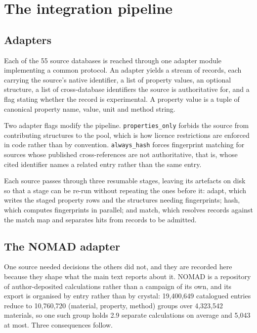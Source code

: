 \section{The integration pipeline}\label{note:pipeline}

\subsection{Adapters}

Each of the 55 source databases is reached through one adapter module
implementing a common protocol. An adapter yields a stream of records, each
carrying the source's native identifier, a list of property values, an optional
structure, a list of cross-database identifiers the source is authoritative for,
and a flag stating whether the record is experimental. A property value is a
tuple of canonical property name, value, unit and method string.

Two adapter flags modify the pipeline. \texttt{properties\_only} forbids the
source from contributing structures to the pool, which is how licence
restrictions are enforced in code rather than by convention.
\texttt{always\_hash} forces fingerprint matching for sources whose published
cross-references are not authoritative, that is, whose cited identifier names a
related entry rather than the same entry.

Each source passes through three resumable stages, leaving its artefacts on disk
so that a stage can be re-run without repeating the ones before it: adapt, which
writes the staged property rows and the structures needing fingerprints; hash,
which computes fingerprints in parallel; and match, which resolves records
against the match map and separates hits from records to be admitted.

\subsection{The NOMAD adapter}

One source needed decisions the others did not, and they are recorded here
because they shape what the main text reports about it. NOMAD is a repository of
author-deposited calculations rather than a campaign of its own, and its export
is organised by entry rather than by crystal: 19{,}400{,}649 catalogued entries
reduce to 10{,}760{,}720 (material, property, method) groups over 4{,}323{,}542
materials, so one such group holds 2.9 separate calculations on average and 5{,}043
at most. Three consequences follow.

